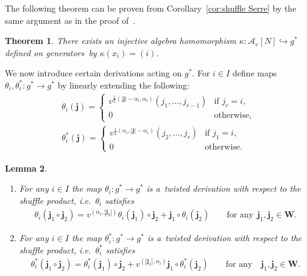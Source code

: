 \documentclass[pdftex]{sigma}
\numberwithin{equation}{section}
\newtheorem{Theorem}{Theorem}[section]
\newtheorem{Lemma}[Theorem]{Lemma}
\begin{document}
The following theorem can be proven from Corollary~\ref{cor:shuffle Serre} by the same argument as in the proof of~\cite[Theorem 4]{leclerc}.
\begin{Theorem}
There exists an injective algebra homomorphism $\kappa: \mathcal{A}_v[N]\hookrightarrow g^*$ defined on generators~by $\kappa(x_i)=(i)$.
\end{Theorem}

We now introduce certain derivations acting on $g^*$.
For $i\in I$ def\/ine maps $\theta_i,\theta_i^*: g^*\to g^*$ by linearly extending the following:
\begin{gather*}
\theta_i(\mathbf{j})=
\begin{cases}
v^{\frac{1}{2}(|\mathbf{j}|-\alpha_i,\alpha_i)}(j_1,\ldots,j_{r-1}) & \text{if $j_r=i$,}
\\
0 & \text{otherwise,}
\end{cases}
\\
\theta^*_i(\mathbf{j})=
\begin{cases}
v^{\frac{1}{2}(\alpha_i,|\mathbf{j}|-\alpha_i)}(j_2,\ldots,j_r) & \text{if $j_1=i$,}
\\
0 & \text{otherwise.}
\end{cases}
\end{gather*}

\begin{Lemma}\qquad
\begin{enumerate}[\upshape (a)]\itemsep=0pt
\item For any $i\in I$ the map $\theta_i: g^*\to g^*$ is a~twisted derivation with respect to the shuffle product, i.e.~$\theta_i$ satisfies
\begin{gather*}
\theta_i(\mathbf{j}_1\circ\mathbf{j}_2)=v^{(\alpha_i,|\mathbf{j}_2|)}\theta_i(\mathbf{j}_1)\circ\mathbf{j}_2+\mathbf{j}_1\circ\theta_i(\mathbf{j}_2)
\qquad
\text{for any}
\ \
\mathbf{j}_1,\mathbf{j}_2\in\mathbf{W}.
\end{gather*}
\item For any $i\in I$ the map $\theta_i^*: g^*\to g^*$ is a~twisted derivation with respect to the shuffle product,
i.e.~$\theta^*_i$ satisfies
\begin{gather*}
\theta^*_i(\mathbf{j}_1\circ\mathbf{j}_2)
=\theta^*_i(\mathbf{j}_1)\circ\mathbf{j}_2+v^{(|\mathbf{j}_1|,\alpha_i)}\mathbf{j}_1\circ\theta^*_i(\mathbf{j}_2)
\qquad
\text{for any}
\quad
\mathbf{j}_1,\mathbf{j}_2\in\mathbf{W}.
\end{gather*}
\end{enumerate}
\end{Lemma}
\end{document}
